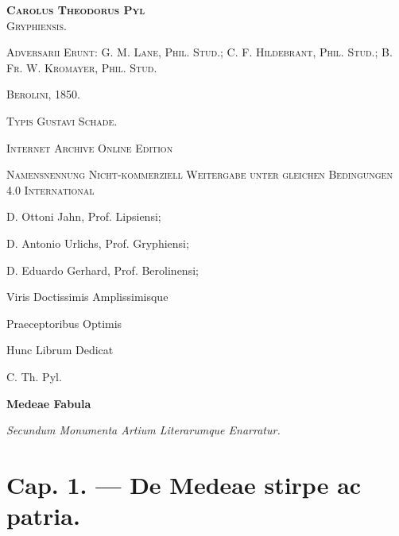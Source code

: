 \documentclass[a4paper, 11pt, oneside, polutonikogreek, german]{article}
\begin{document}
\begin{titlepage}
        {\scshape \Large \textbf{Carolus Theodorus Pyl}\\\normalsize Gryphiensis.} %

	\vspace*{1\baselineskip} %

        {\scshape \scriptsize Adversarii Erunt: G. M. Lane, Phil. Stud.; C. F. Hildebrant, Phil. Stud.; B. Fr. W. Kromayer, Phil. Stud.}
        \vspace*{\fill}

	\vspace{1\baselineskip}

	{\small\scshape Berolini, 1850.}
	
	{\small\scshape{Typis Gustavi Schade.}}
	
	\vspace{0.5\baselineskip} %

        \scshape Internet Archive Online Edition%
	
	{\scshape\small Namensnennung Nicht-kommerziell Weitergabe unter gleichen Bedingungen 4.0 International} %
\end{titlepage}
\setlength{\parskip}{1mm plus1mm minus1mm}
\clearpage
\large
\tableofcontents
\clearpage
\bfseries
\vspace*{\fill}

D. Ottoni Jahn, Prof. Lipsiensi;

D. Antonio Urlichs, Prof. Gryphiensi;

D. Eduardo Gerhard, Prof. Berolinensi;

Viris Doctissimis Amplissimisque

Praeceptoribus Optimis

Hunc Librum Dedicat

C. Th. Pyl.
\vspace*{\fill}
\clearpage
\begin{center}
\Huge\textbf{Medeae Fabula}

\large\emph{Secundum Monumenta Artium Literarumque Enarratur.}
\end{center}
\section{Cap. 1. --- De Medeae stirpe ac patria.}
\end{document}
